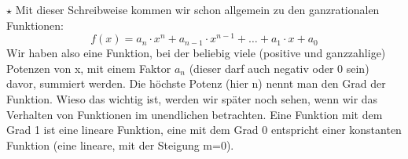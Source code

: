 		\(\star\) Mit dieser Schreibweise kommen wir schon allgemein zu den
		ganzrationalen Funktionen:
		\[f(x)=a_n \cdot x^n+a_{n-1} \cdot x^{n-1}+\ldots +a_1 \cdot x+a_0\]
		Wir haben also eine Funktion, bei der beliebig viele (positive und
		ganzzahlige) Potenzen von x, mit einem Faktor \(a_n\) (dieser darf auch
		negativ oder 0 sein) davor, summiert werden. Die höchste Potenz (hier n) nennt
		man den Grad der Funktion. Wieso das wichtig ist, werden wir später noch
		sehen, wenn wir das Verhalten von Funktionen im unendlichen betrachten. Eine
		Funktion mit dem Grad 1 ist eine lineare Funktion, eine mit dem Grad 0
		entspricht einer konstanten Funktion (eine lineare, mit der Steigung m=0).


